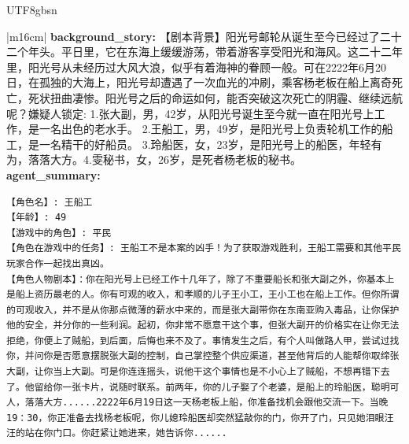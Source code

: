 \documentclass[11pt]{article}
\begin{document}
{\begin{CJK}{UTF8}{gbsn}
\begin{table}[ht!]
\begin{tabular}{|m{16cm}|}
\textbf{   background\_story:} \small【剧本背景】阳光号邮轮从诞生至今已经过了二十二个年头。平日里，它在东海上缓缓游荡，带着游客享受阳光和海风。这二十二年里，阳光号从未经历过大风大浪，似乎有着海神的眷顾一般。可在2222年6月20日，在孤独的大海上，阳光号却遭遇了一次血光的冲刷，乘客杨老板在船上离奇死亡，死状扭曲凄惨。阳光号之后的命运如何，能否突破这次死亡的阴霾、继续远航呢？嫌疑人锁定: 1.张大副，男，42岁，从阳光号诞生至今就一直在阳光号上工作，是一名出色的老水手。 2.王船工，男，49岁，是阳光号上负责轮机工作的船工，是一名精干的好船员。 3.玲船医，女，23岁，是阳光号上的船医，年轻有为，落落大方。4.雯秘书，女，26岁，是死者杨老板的秘书。\\
 \textbf{   agent\_summary:} \\
\begin{minipage}[t]{\linewidth}
\small\begin{verbatim}
【角色名】: 王船工
【年龄】: 49
【游戏中的角色】: 平民
【角色在游戏中的任务】: 王船工不是本案的凶手！为了获取游戏胜利，王船工需要和其他平民玩家合作一起找出真凶。
【角色人物剧本】：你在阳光号上已经工作十几年了，除了不重要船长和张大副之外，你基本上是船上资历最老的人。你有可观的收入，和孝顺的儿子王小工，王小工也在船上工作。但你所谓的可观收入，并不是从你那点微薄的薪水中来的，而是张大副带你在东南亚购入毒品，让你保护他的安全，并分你的一些利润。起初，你非常不愿意干这个事，但张大副开的价格实在让你无法拒绝，你便上了贼船，到后面，后悔也来不及了。事情发生之后，有个人叫做路人甲，尝试过找你，并问你是否愿意摆脱张大副的控制，自己掌控整个供应渠道，甚至他背后的人能帮你取缔张大副，让你当上大副。可是你连连摇头，说他干这个事情也是不小心上了贼船，不想再错下去了。他留给你一张卡片，说随时联系。前两年，你的儿子娶了个老婆，是船上的玲船医，聪明可人，落落大方......2222年6月19日这一天杨老板上船，你准备找机会跟他交流一下。当晚19：30，你正准备去找杨老板呢，你儿媳玲船医却突然猛敲你的门，你开了门，只见她泪眼汪汪的站在你门口。你赶紧让她进来，她告诉你......


\end{verbatim}
\end{minipage}
\end{tabular}
\end{table}
\end{CJK}}
\end{document}
